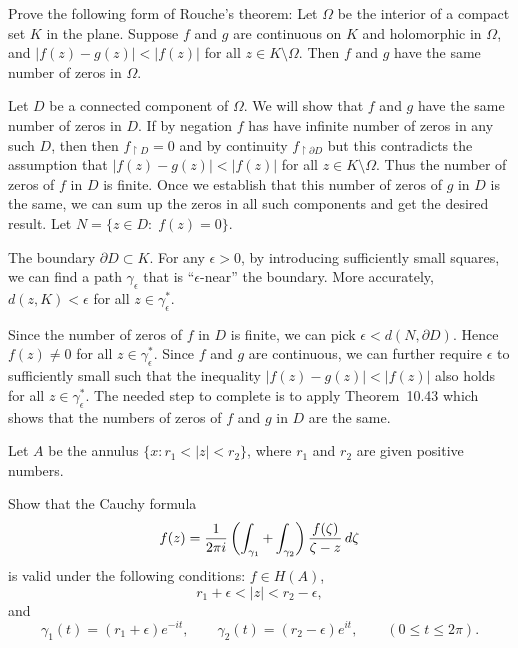 \begin{enumerate}
\begin{excopy}
Prove the following form of
Rouche's theorem:
Let \(\Omega\) be the interior of a compact set $K$ in the plane.
Suppose $f$ and $g$ are continuous on $K$ and holomorphic in \(\Omega\),
and \(|f(z)-g(z)|<|f(z)|\) for all \(z\in K\setminus \Omega\).
Then $f$ and $g$ have the same number of zeros in \(\Omega\).
\end{excopy}

Let $D$ be a connected component of  \(\Omega\).
We will show that $f$ and $g$ have the same number of zeros in $D$.
If by negation $f$ has have infinite number of zeros in any such $D$,
then then \(f_{\restriction D}=0\) and by continuity
 \(f_{\restriction \partial D}\) but this contradicts the assumption 
that \(|f(z)-g(z)|<|f(z)|\) for all \(z\in K\setminus \Omega\).
Thus the number of zeros of $f$ in $D$ is finite.
Once we establish that this number of zeros of $g$ in $D$ is the same,
we can sum up the zeros in all such components and get the desired
result. Let \(N = \{z\in D:\; f(z) = 0\}\).

The boundary \(\partial D \subset K\). For any \(\epsilon>0\),
by introducing sufficiently small squares,
we can find a path \(\gamma_\epsilon\) that is ``\(\epsilon\)-near'' the boundary.
More accurately, \(d(z,K)<\epsilon\) for all \(z\in \gamma_\epsilon^*\).

Since the number of zeros of $f$ in $D$ is finite, we can pick 
\(\epsilon < d(N,\partial D)\).
Hence \(f(z)\neq 0\) for all \(z\in \gamma_\epsilon^*\).
Since $f$ and $g$ are continuous, we can further require \(\epsilon\)
to sufficiently small such that the inequality \(|f(z)-g(z)|<|f(z)|\)
also holds for all \(z\in\gamma_\epsilon^*\).
The needed step to complete is to apply Theorem~10.43
which shows that the numbers of zeros of $f$ and $g$ in $D$ are the same.


\begin{excopy}
Let $A$ be the
annulus \(\{x: r_1 < |z| < r_2\}\), where \(r_1\) and \(r_2\) are given
positive numbers.
\begin{itemize}

 Show that the Cauchy formula
\begin{equation*}
f(z) = \frac{1}{2\pi i} \left(\int_{\gamma_1} + \int_{\gamma_2}\right)
       \frac{f(\zeta)}{\zeta - z}\,d\zeta
\end{equation*}
is valid under the following conditions: \(f\in H(A)\),
\begin{equation*}
r_1 + \epsilon < |z| < r_2 - \epsilon,
\end{equation*}
and
\begin{equation*}
\gamma_1(t) = (r_1+\epsilon)e^{-it},
\qquad
\gamma_2(t) = (r_2-\epsilon)e^{it},
\qquad
(0\leq t \leq 2\pi).
\end{equation*}


\end{itemize}
\end{excopy}
\end{enumerate}
